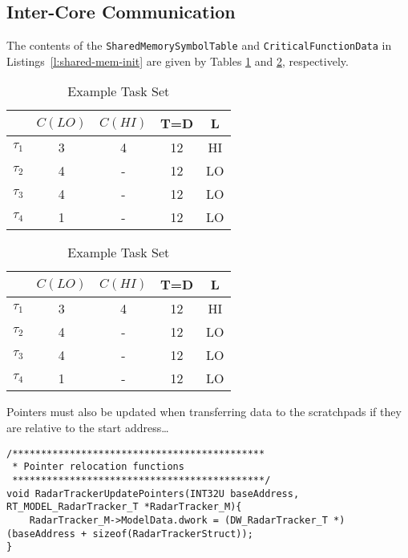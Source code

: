 \subsection{Inter-Core Communication}
\label{s:inter-core}
	The contents of the \texttt{SharedMemorySymbolTable} and \texttt{CriticalFunctionData} in Listings~\ref{l:shared-mem-init} are given by Tables \ref{t:stab} and \ref{t:crit-data}, respectively.
	
% 

	
\begin{table}[h]
\caption{Example Task Set}
\centering
	\begin{tabular}{@{}lcccc@{}}
	\toprule
	& $C(LO)$ & $C(HI)$ & T=D & L 	 \\
	\bottomrule
	$\tau_1$ & 3 & 4 & 12 & HI  \\
	$\tau_2$ & 4 & - & 12 & LO  \\
	$\tau_3$ & 4 & - & 12 & LO  \\
	$\tau_4$ & 1 & - & 12 & LO  \\
	\end{tabular}

\label{t:stab}
\end{table}
	

\begin{table}[h]
\caption{Example Task Set}
\centering

	\begin{tabular}{@{}lcccc@{}}
	\toprule
	& $C(LO)$ & $C(HI)$ & T=D & L 	 \\
	\bottomrule
	$\tau_1$ & 3 & 4 & 12 & HI  \\
	$\tau_2$ & 4 & - & 12 & LO  \\
	$\tau_3$ & 4 & - & 12 & LO  \\
	$\tau_4$ & 1 & - & 12 & LO  \\
	\end{tabular}

\label{t:crit-data}
\end{table}
	
	
	
Pointers must also be updated when transferring data to the scratchpads if they are relative to the start address\ldots
{}


\begin{lstlisting}
/********************************************
 * Pointer relocation functions
 ********************************************/
void RadarTrackerUpdatePointers(INT32U baseAddress, RT_MODEL_RadarTracker_T *RadarTracker_M){
	RadarTracker_M->ModelData.dwork = (DW_RadarTracker_T *)(baseAddress + sizeof(RadarTrackerStruct));
}
\end{lstlisting}

